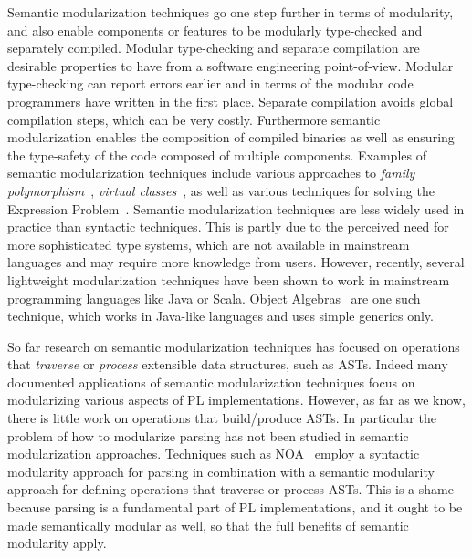 Semantic modularization techniques go one step further in terms of modularity,
and also enable components or features to be modularly type-checked
and separately compiled. Modular type-checking and separate
compilation are desirable properties to have from a software
engineering point-of-view. Modular type-checking can report errors
earlier and in terms of the modular code programmers have written
in the first place. Separate compilation avoids global compilation
steps, which can be very costly. Furthermore semantic modularization
enables the composition of compiled binaries as well as ensuring the
type-safety of the code composed of multiple components. Examples of semantic modularization techniques
include various approaches to \emph{family polymorphism}~\cite{ernst01FP},
\emph{virtual classes}~\cite{Ernst:2006}, as
well as various techniques for solving the Expression
Problem~\cite{torgersen2004expression,odersky2005independently,Oliveira:2012,wang2016expression}.
Semantic modularization techniques are less widely used in practice
than syntactic techniques. This is partly due to the perceived need for more
sophisticated type systems, which are not available in mainstream
languages and may require more knowledge from users. However, recently,
several lightweight modularization techniques have been shown to work
in mainstream programming languages like Java or Scala. Object
Algebras~\cite{Oliveira:2012} are one such technique, which works in
Java-like languages and uses simple generics only.

So far research on semantic modularization techniques has focused on
operations that \emph{traverse} or \emph{process} extensible
data structures, such as ASTs. Indeed many documented applications of
semantic modularization techniques focus on modularizing various
aspects of PL implementations.  However, as far as we know, there is
little work on operations that build/produce ASTs.  In particular the
problem of how to modularize parsing has not been studied in semantic
modularization approaches. Techniques such as NOA~\cite{Gouseti2014}
employ a syntactic modularity approach for parsing in combination with
a semantic modularity approach for defining operations
that traverse or process ASTs. This is a shame because parsing is a
fundamental part of PL implementations, and it ought to be made
semantically modular as well, so that the full benefits of semantic
modularity apply.


